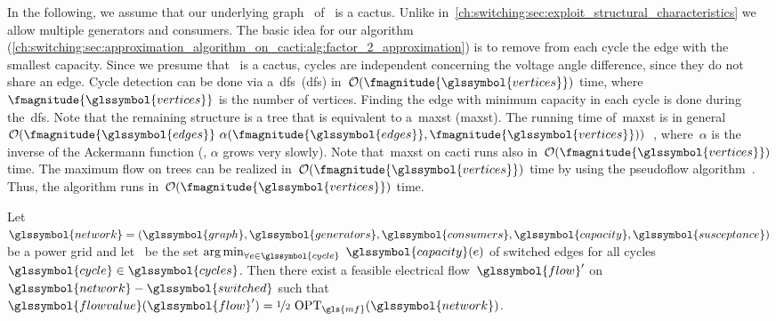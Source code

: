 In the following, we assume that our underlying graph~
of~ is a cactus. Unlike
in~\cref{ch:switching:sec:exploit_structural_characteristics} we allow multiple
generators and consumers.
% 
The basic idea for our algorithm
(\cref{ch:switching:sec:approximation_algorithm_on_cacti:alg:factor_2_approximation})
is to remove from each cycle the edge with the smallest capacity. Since we
presume that~ is a cactus, cycles are independent concerning
the voltage angle difference, since they do not share an edge. Cycle detection
can be done via a~\acrlong{dfs}~(\gls{dfs})
in~$\bigO(\fmagnitude{\glssymbol{vertices}})$ time,
where~$\fmagnitude{\glssymbol{vertices}}$ is the number of vertices. Finding
the edge with minimum capacity in each cycle is done during the~\gls{dfs}.
% 
% 
Note that the remaining structure is a tree that is equivalent to
a~\acrlong{maxst} (\gls{maxst}). The running time of~\gls{maxst} is in
general~$\bigO(\fmagnitude{\glssymbol{edges}}~\alpha(\fmagnitude{\glssymbol{edges}},
\fmagnitude{\glssymbol{vertices}}))$~\parencite{Cha00}, where~$\alpha$ is the
inverse of the Ackermann function (\ie, $\alpha$ grows very slowly). Note
that~\gls{maxst} on cacti runs also in~$\bigO
(\fmagnitude{\glssymbol{vertices}})$ time.
% 
The maximum flow on trees can be realized
in~$\bigO(\fmagnitude{\glssymbol{vertices}})$ time by using the pseudoflow
algorithm~\parencite{Hoc08}. Thus, the algorithm runs
in~$\bigO(\fmagnitude{\glssymbol{vertices}})$ time.
%
\begin{lemma}
    Let~$\glssymbol{network}=
    (\glssymbol{graph},\glssymbol{generators},\glssymbol{consumers},\glssymbol{capacity},\glssymbol{susceptance})$
    be a power grid and let~ be the set
    $\argmin_{\forall\edge\in\glssymbol{cycle}}$ $\glssymbol{capacity}(\edge)$
    of switched edges for all cycles~$\glssymbol{cycle}\in\glssymbol{cycles}$.
    Then there exist a feasible electrical flow~$\glssymbol{flow}'$
    on~$\glssymbol{network}-\glssymbol{switched}$ such
    that~$\glssymbol{flowvalue}(\glssymbol{flow}')=
    \nicefrac{1}{2}~\opt_{\gls{mf}}(\glssymbol{network})$.%
    \label{ch:switching:sec:approximation_algorithm_on_cacti:lem:half_flow}
\end{lemma}
%
